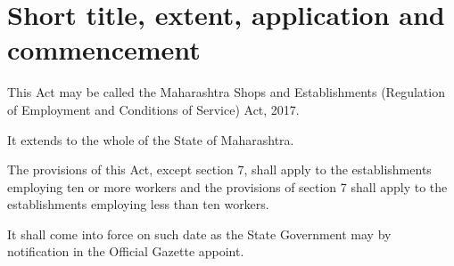 \documentclass[gaz5a]{mhact}
\begin{document}
\section{Short title, extent, application and commencement}

\begin{subsectionlist}
\item This Act may be called the Maharashtra Shops and Establishments
(Regulation of Employment and Conditions of Service) Act, 2017.
\item It extends to the whole of the State of Maharashtra.
\item The provisions of this Act, except section 7, shall apply to the
establishments employing ten or more workers and the provisions of section
7 shall apply to the establishments employing less than ten workers.
\item It shall come into force on such date as the State Government may by
notification in the Official Gazette appoint.
\end{subsectionlist}
\end{document}
